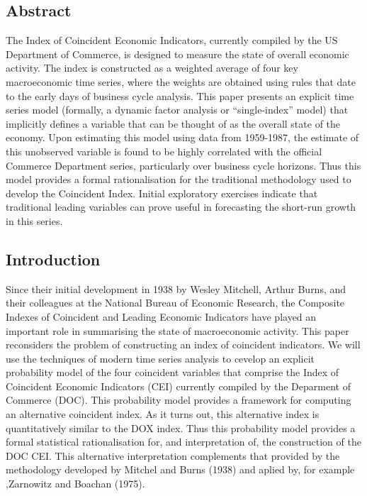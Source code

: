 \subsection*{Abstract}

The Index of Coincident Economic Indicators, currently compiled by the US Department of Commerce, is designed to measure the state of overall economic activity. The index is constructed as a weighted average of four key macroeconomic time series, where the weights are obtained using rules that date to the early days of business cycle analysis. This paper presents an explicit time series model (formally, a dynamic factor analysis or ``single-index'' model) that implicitly defines a variable that can be thought of as the overall state of the economy. Upon estimating this model using data from 1959-1987, the estimate of this unobserved variable is found to be highly correlated with the official Commerce Department series, particularly over business cycle horizons. Thus this model provides a formal rationalisation for the traditional methodology used to develop the Coincident Index. Initial exploratory exercises indicate that traditional leading variables can prove useful in forecasting the short-run growth in this series.

\subsection{Introduction}

Since their initial development in 1938 by Wesley Mitchell, Arthur Burns, and their colleagues at the National Bureau of Economic Research, the Composite Indexes of Coincident and Leading Economic Indicators have played an important role in summarising the state of macroeconomic activity. This paper reconsiders the problem of constructing an index of coincident indicators. We will use the techniques of modern time series analysis to cevelop an explicit probability model of the four coincident variables that comprise the Index of Coincident Economic Indicators (CEI) currently compiled by the Deparment of Commerce (DOC). This probability model provides a framework for computing an alternative coincident index. As it turns out, this alternative index is quantitatively similar  to the DOX index. Thus this probability model provides a formal statistical rationalisation for, and interpretation of, the construction of the DOC CEI. This alternative interpretation complements that provided by the methodology developed by Mitchel and Burns (1938) and aplied by, for example ,Zarnowitz and Boachan (1975).

